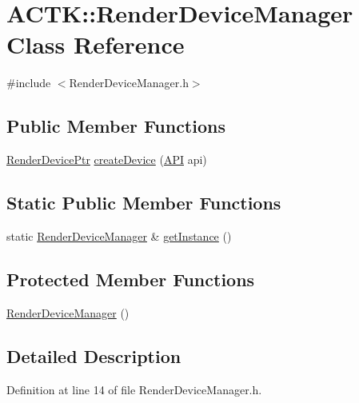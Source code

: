 \hypertarget{class_a_c_t_k_1_1_render_device_manager}{\section{A\-C\-T\-K\-:\-:Render\-Device\-Manager Class Reference}
\label{class_a_c_t_k_1_1_render_device_manager}
}


{\ttfamily \#include $<$Render\-Device\-Manager.\-h$>$}

\subsection*{Public Member Functions}
\begin{DoxyCompactItemize}
\item 
\hyperlink{namespace_a_c_t_k_a456b9e135a6c2d4a753f35fe9b5ac009}{Render\-Device\-Ptr} \hyperlink{class_a_c_t_k_1_1_render_device_manager_a2fda73bc94b829f4e26ceb53ceba2c8c}{create\-Device} (\hyperlink{namespace_a_c_t_k_a774b0600420b8e9981d6a7d9879011af}{A\-P\-I} api)
\end{DoxyCompactItemize}
\subsection*{Static Public Member Functions}
\begin{DoxyCompactItemize}
\item 
static \hyperlink{class_a_c_t_k_1_1_render_device_manager}{Render\-Device\-Manager} \& \hyperlink{class_a_c_t_k_1_1_render_device_manager_abc41910c53993fa082bdaccb5614ffb7}{get\-Instance} ()
\end{DoxyCompactItemize}
\subsection*{Protected Member Functions}
\begin{DoxyCompactItemize}
\item 
\hyperlink{class_a_c_t_k_1_1_render_device_manager_aaecedc6bed90a1e0cfb99ad7fbb65f8d}{Render\-Device\-Manager} ()
\end{DoxyCompactItemize}


\subsection{Detailed Description}


Definition at line 14 of file Render\-Device\-Manager.\-h.



